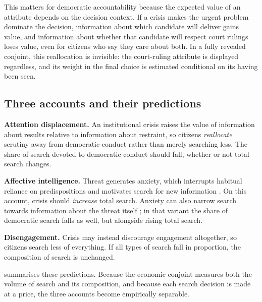 \documentclass[11pt]{article}
\begin{document}
This matters for democratic accountability because the expected value of an attribute depends on the decision context. If a crisis makes the urgent problem dominate the decision, information about which candidate will deliver gains value, and information about whether that candidate will respect court rulings loses value, even for citizens who say they care about both. In a fully revealed conjoint, this reallocation is invisible: the court-ruling attribute is displayed regardless, and its weight in the final choice is estimated conditional on its having been seen.

\subsection{Three accounts and their predictions}

\textbf{Attention displacement.} An institutional crisis raises the value of information about results relative to information about restraint, so citizens \emph{reallocate} scrutiny away from democratic conduct rather than merely searching less. The share of search devoted to democratic conduct should fall, whether or not total search changes.

\textbf{Affective intelligence.} Threat generates anxiety, which interrupts habitual reliance on predispositions and motivates search for new information \parencite{Marcus1993a,MarcusNeumanMacKuen2000,ValentinoEtAl2008}. On this account, crisis should \emph{increase} total search. Anxiety can also narrow search towards information about the threat itself \parencite{GadarianAlbertson2014}; in that variant the share of democratic search falls as well, but alongside rising total search.

\textbf{Disengagement.} Crisis may instead discourage engagement altogether, so citizens search less of everything. If all types of search fall in proportion, the composition of search is unchanged.

 summarises these predictions. Because the economic conjoint measures both the volume of search and its composition, and because each search decision is made at a price, the three accounts become empirically separable.
\end{document}
